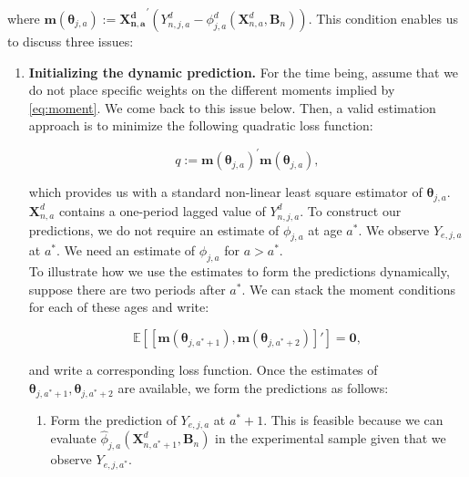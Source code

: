 \noindent where $\bm{m} \left( \bm{\theta}_{j,a} \right) := {\bm{X_{n,a}^d}}^{'} \left( Y_{n,j,a}^d -   \phi^d_{j,a} \left( \bm{X}_{n,a}^d, \bm{B}_{n} \right) \right)$. This condition enables us to discuss three issues: 

\begin{enumerate}
\item \textbf{Initializing the dynamic prediction.} 
\noindent For the time being, assume that we do not place specific weights on the different moments implied by \eqref{eq:moment}. We come back to this issue below. Then, a valid estimation approach is to minimize the following quadratic loss function: 

\begin{equation}
q :=  {\bm{m} \left( \bm{\theta}_{j,a} \right)}^{'}{\bm{m} \left( \bm{\theta}_{j,a} \right)}, \label{eq:loss}
\end{equation}

\noindent which provides us with a standard non-linear least square estimator of $\bm{\theta}_{j,a}$.\\

\noindent $\bm{X}_{n,a}^d$ contains a one-period lagged value of $Y_{n,j,a}^d$. To construct our predictions, we do not require an estimate of $\phi_{j,a}$ at age $a^*$. We observe $Y_{e,j,a}$ at $a^*$. We need an estimate of $\phi_{j,a}$ for $a > a^*$.\\ 

\noindent To illustrate how we use the estimates to form the predictions dynamically, suppose there are two periods after $a^*$. We can stack the moment conditions for each of these ages and write: 

\begin{equation}
\mathbb{E} \left[  \left[ \bm{m} \left( \bm{\theta}_{j,a^* + 1}  \right)   , \bm{m} \left( \bm{\theta}_{j,a^* + 2} \right)  \right]'  \right] = \bm{0}, 
\end{equation}

\noindent and write a corresponding loss function. Once the estimates of $\bm{\theta}_{j,a^* + 1}, \bm{\theta}_{j,a^* + 2}$ are available, we form the predictions as follows: 

\begin{enumerate}
\item Form the prediction of $Y_{e,j,a}$ at $a^* + 1$. This is feasible because we can evaluate $ \hat{\phi}_{j,a}\left( \bm{X}_{n,a^*+1}^d, \bm{B}_{n} \right)$ in the experimental sample given that we observe $Y_{e,j,a^*}$.


\end{enumerate}
\end{enumerate}
